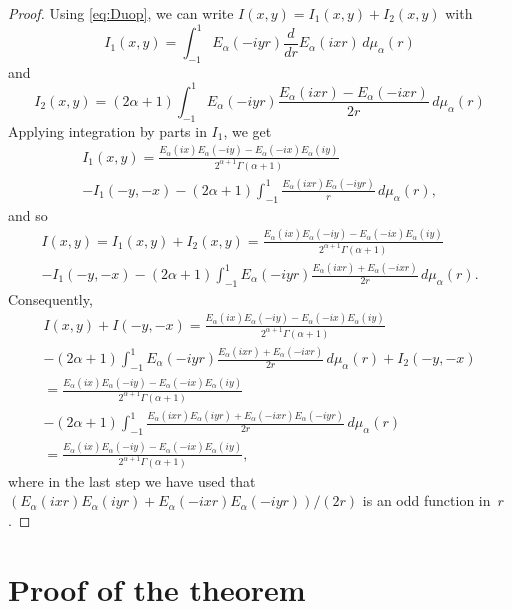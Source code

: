 \documentclass[a4paper]{amsart}
\theoremstyle{plain}
\theoremstyle{remark}
\newcommand{\mua}{\mu_\alpha}
\begin{document}
\begin{proof}
Using \eqref{eq:Duop}, we can write $I(x,y) = I_1(x,y)+I_2(x,y)$ with
\[
  I_1(x,y) = \int_{-1}^1E_{\alpha}(-iyr)\frac{d}{dr}E_{\alpha}(ixr)\,d\mua(r)
\]
and
\[
  I_2(x,y) = (2\alpha+1) \int_{-1}^1E_{\alpha}(-iyr)
    \frac{E_{\alpha}(ixr)-E_{\alpha}(-ixr)}{2r}\,d\mua(r)
\]
Applying integration by parts in $I_1$, we get
\begin{multline*}
  I_1(x,y) = \frac{E_{\alpha}(ix)E_{\alpha}(-iy) - E_{\alpha}(-ix)E_{\alpha}(iy)}
    {2^{\alpha+1}\Gamma(\alpha+1)} \\
  - I_1(-y,-x) - (2\alpha+1) \int_{-1}^1 \frac{E_{\alpha}(ixr)E_{\alpha}(-iyr)}{r}
    \, d\mua(r),
\end{multline*}
and so
\begin{multline*}
  I(x,y) = I_1(x,y)+I_2(x,y)
  = \frac{E_{\alpha}(ix)E_{\alpha}(-iy) - E_{\alpha}(-ix)E_{\alpha}(iy)}
    {2^{\alpha+1}\Gamma(\alpha+1)} \\
  - I_1(-y,-x) - (2\alpha+1) \int_{-1}^1 E_{\alpha}(-iyr)
    \frac{E_{\alpha}(ixr)+E_{\alpha}(-ixr)}{2r}\, d\mua(r).
\end{multline*}
Consequently,
\begin{multline*}
  I(x,y)+I(-y,-x)
  = \frac{E_{\alpha}(ix)E_{\alpha}(-iy)-E_{\alpha}(-ix)E_{\alpha}(iy)}
    {2^{\alpha+1}\Gamma(\alpha+1)}\\
  - (2\alpha+1) \int_{-1}^1 E_{\alpha}(-iyr)
    \frac{E_{\alpha}(ixr)+E_{\alpha}(-ixr)}{2r}\, d\mua(r) + I_2(-y,-x) \\
  = \frac{E_{\alpha}(ix)E_{\alpha}(-iy)-E_{\alpha}(-ix)E_{\alpha}(iy)}
    {2^{\alpha+1}\Gamma(\alpha+1)} \\
  -(2\alpha+1) \int_{-1}^1
    \frac{E_{\alpha}(ixr)E_{\alpha}(iyr)+E_{\alpha}(-ixr)E_{\alpha}(-iyr)}{2r}
    \, d\mua(r) \\
  = \frac{E_{\alpha}(ix)E_{\alpha}(-iy)-E_{\alpha}(-ix)E_{\alpha}(iy)}
    {2^{\alpha+1}\Gamma(\alpha+1)},
\end{multline*}
where in the last step we have used that
$(E_{\alpha}(ixr)E_{\alpha}(iyr)+E_{\alpha}(-ixr)E_{\alpha}(-iyr))/(2r)$
is an odd function in~$r$.
\end{proof}

\section{Proof of the theorem}
\end{document}
